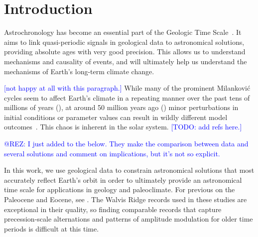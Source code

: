 \documentclass[draft]{agujournal2019}
\newcommand{\ijk}{\textcolor{blue}}
\begin{document}





\section{Introduction}\label{sec:intro}

Astrochronology has become an essential part of the Geologic Time Scale~\cite{Laskar2020}.
It aims to link quasi-periodic signals in geological data to astronomical solutions,
providing absolute ages with very good precision.
This allows us to understand mechanisms and causality of events,
and will ultimately help us understand the mechanisms of Earth's long-term climate change.

\ijk{[not happy at all with this paragraph.]}
While many of the prominent Milankovi\'{c} cycles seem to affect Earth's climate in a repeating manner over the past tens of millions of years (\si{\millionyear}),
at around \num{50} million years ago (\si{\millionyearago}) minor perturbations in initial conditions or parameter values can result in wildly different model outcomes~\cite{Zeebe2017}.
This chaos is inherent in the solar system. \ijk{[TODO: add refs here.]}

\ijk{@REZ: I just added \cite{Westerhold2017} to the below. They make the comparison between data and several solutions and comment on implications, but it's not so explicit.}

In this work, we use geological data to constrain astronomical solutions that most accurately reflect Earth's orbit in order to ultimately provide an astronomical time scale for applications in geology and paleoclimate.
For previous on the Paleocene and Eocene, see .
The Walvis Ridge records used in these studies are exceptional in their quality, so finding comparable records that capture precession-scale alternations and patterns of amplitude modulation for older time periods is difficult at this time.
\end{document}
